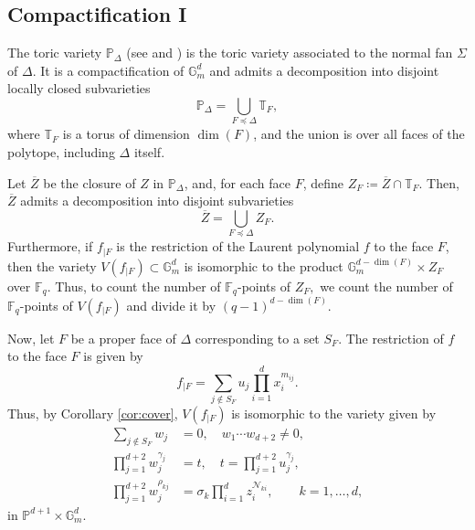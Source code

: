 \documentclass[11pt, reqno]{amsart}
\theoremstyle{plain}
\theoremstyle{definition}
\newcommand{\Ps}{\mathbb{P}}
\newcommand{\F}{\mathbb{F}}
\newcommand{\T}{\mathbb{T}}
\newcommand{\ga}{\gamma}
\newcommand{\G}{\mathbb{G}}
\begin{document}
\subsection{Compactification I}\label{subsection:compactification-1}
The toric variety $\Ps_{\Delta}$  (see \cite{Denef-Loeser} and \cite{Danilov-Khovanskii}) is the toric variety associated to the normal fan $\Sigma$ of $\Delta$. 
It is a compactification of $\G_m^d$ and admits a decomposition into disjoint locally closed subvarieties
\begin{equation}\label{eq:toric-strati}
\Ps_{\Delta}= \bigcup_{F \preceq \Delta } \T_F,
\end{equation}
where $\T_F$ is a torus of dimension $\dim(F)$,  and the union is over all faces of the polytope, including $\Delta$ itself.

Let $\overline{Z}$ be the closure of $Z$ in $\Ps_{\Delta}$, and, for each face $F$, define $Z_F\coloneqq \overline{Z} \cap \T_F $. Then, $\overline{Z}$ admits a decomposition into disjoint subvarieties
\[
\overline{Z} = \bigcup_{F \preceq \Delta }  Z_F.
\]
Furthermore, if $f_{|F}$ is the restriction of the Laurent polynomial $f$ to the face $F$, then the variety $V(f_{|F}) \subset \G_m^{d}$ is isomorphic to the product  $\G_m^{d-\dim(F)} \times Z_F$ over $\F_q$.
Thus, to count the number of $\F_q$-points of $Z_F,$ we count the number of $\F_q$-points of $V(f_{|F})$ and divide it by $(q-1)^{d-\dim(F)}$.

Now, let $F$ be a proper face of $\Delta$ corresponding to a set $S_F$. The restriction of $f$ to the face $F$ is given by
\[
f_{|F} = \sum_{j \notin S_F} u_j \prod_{i=1}^d x_i^{m_{ij}}.
\]
Thus, by Corollary \ref{cor:cover}, $V(f_{|F})$ is isomorphic to the variety given by
\begin{align*}
   \sum_{j\notin S_F} w_j&= 0, \quad  w_1\cdots w_{d+2} \neq 0,\\
    \prod_{j=1}^{d+2} w_j^{\gamma_j} &=t, \quad t = \prod_{j=1}^{d+2} u_j^{\ga_j},\\
    \prod_{j=1}^{d+2} w_j^{\rho_{kj}} &= \sigma_k \prod_{i=1}^d z_i^{\mathcal{N}_{ki}},  \qquad k=1,\dots,d,
\end{align*}
in $\mathbb{P}^{d+1} \times \G_m^{d}$.
\end{document}
